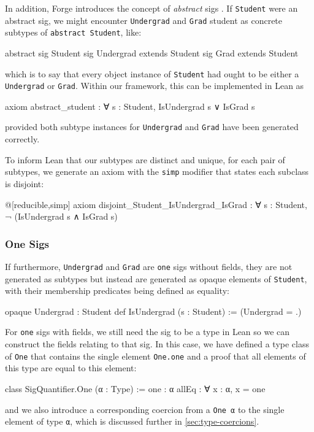 In addition, Forge introduces the concept of \emph{abstract} sigs \cite{jackson2012software}. If \texttt{Student} were an abstract sig, we might encounter \texttt{Undergrad} and \texttt{Grad} student as concrete subtypes of \texttt{abstract Student}, like:
\begin{forge*}
abstract sig Student {}
sig Undergrad extends Student {}
sig Grad extends Student {}
\end{forge*}
which is to say that every object instance of \texttt{Student} had ought to be either a \texttt{Undergrad} or \texttt{Grad}. Within our framework, this can be implemented in Lean as
\begin{lean*}
axiom abstract_student : ∀ s : Student, IsUndergrad s ∨ IsGrad s
\end{lean*}
provided both subtype instances for \texttt{Undergrad} and \texttt{Grad} have been generated correctly. 

To inform Lean that our subtypes are distinct and unique, for each pair of subtypes, we generate an axiom with the \texttt{simp} modifier that states each subclass is disjoint: 
\begin{lean*}
@[reducible,simp] axiom disjoint_Student_IsUndergrad_IsGrad : 
  ∀ s : Student, ¬ (IsUndergrad s ∧ IsGrad s)
\end{lean*}

\subsubsection{One Sigs}

If furthermore, \texttt{Undergrad} and \texttt{Grad} are \texttt{one} sigs without fields, they are not generated as subtypes but instead are generated as opaque elements of \texttt{Student}, with their membership predicates being defined as equality: 
\begin{lean*}
opaque Undergrad : Student
def IsUndergrad (s : Student) := (Undergrad = .)
\end{lean*}

For \texttt{one} sigs with fields, we still need the sig to be a type in Lean so we can construct the fields relating to that sig. In this case, we have defined a type class of \texttt{One} that contains the single element \texttt{One.one} and a proof that all elements of this type are equal to this element: 
\begin{leanimpl*}
class SigQuantifier.One (α : Type) :=
  one : α
  allEq : ∀ x : α, x = one
\end{leanimpl*}
and we also introduce a corresponding coercion from a \texttt{One α} to the single element of type \texttt{α}, which is discussed further in \cref{sec:type-coercions}.
